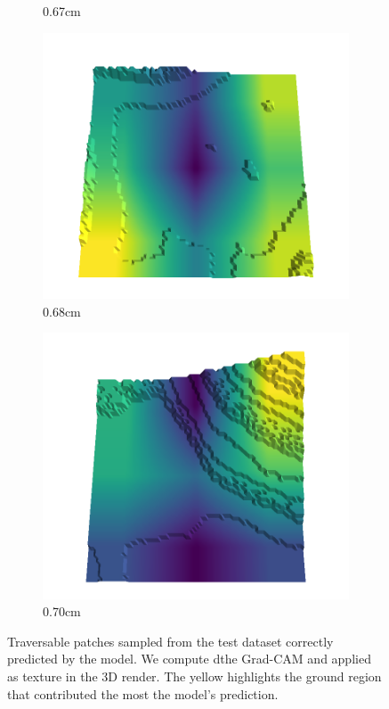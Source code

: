 \begin{figure}[H]
\begin{subfigure}[b]{0.192\linewidth}
    \caption{0.67cm}
    \label{fig : quarry-best-18}
    \end{subfigure}
    \begin{subfigure}[b]{0.192\linewidth}
    \includegraphics[width=\linewidth]{../img/5/quarry/best/68-patch-3d-majavi-colormap-180.png}
    \caption{0.68cm}
    \label{fig : quarry-best-19}
    \end{subfigure}
    \begin{subfigure}[b]{0.192\linewidth}
    \includegraphics[width=\linewidth]{../img/5/quarry/best/70-patch-3d-majavi-colormap-190.png}
    \caption{0.70cm}
    \label{fig : quarry-best-20}
    \end{subfigure}
    \label{fig : quarry-best}
    \caption{Traversable patches sampled from the test dataset correctly predicted by the model. We compute dthe Grad-CAM and applied as texture in the 3D render. The yellow highlights the ground region that contributed the most the model's prediction. }
    \end{figure}

